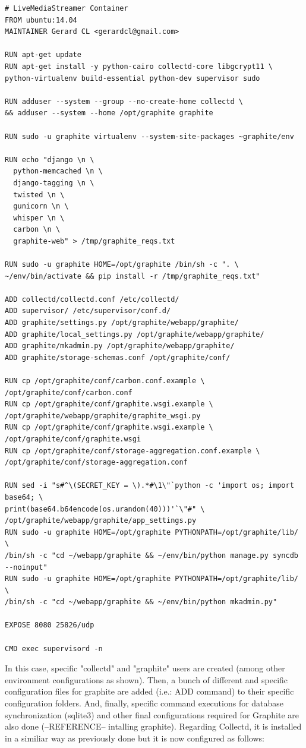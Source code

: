 \begin{verbatim}
# LiveMediaStreamer Container
FROM ubuntu:14.04
MAINTAINER Gerard CL <gerardcl@gmail.com>

RUN apt-get update
RUN apt-get install -y python-cairo collectd-core libgcrypt11 \
python-virtualenv build-essential python-dev supervisor sudo

RUN adduser --system --group --no-create-home collectd \
&& adduser --system --home /opt/graphite graphite

RUN sudo -u graphite virtualenv --system-site-packages ~graphite/env

RUN echo "django \n \
  python-memcached \n \
  django-tagging \n \
  twisted \n \
  gunicorn \n \
  whisper \n \
  carbon \n \
  graphite-web" > /tmp/graphite_reqs.txt

RUN sudo -u graphite HOME=/opt/graphite /bin/sh -c ". \
~/env/bin/activate && pip install -r /tmp/graphite_reqs.txt"

ADD collectd/collectd.conf /etc/collectd/
ADD supervisor/ /etc/supervisor/conf.d/
ADD graphite/settings.py /opt/graphite/webapp/graphite/
ADD graphite/local_settings.py /opt/graphite/webapp/graphite/
ADD graphite/mkadmin.py /opt/graphite/webapp/graphite/
ADD graphite/storage-schemas.conf /opt/graphite/conf/

RUN cp /opt/graphite/conf/carbon.conf.example \
/opt/graphite/conf/carbon.conf
RUN cp /opt/graphite/conf/graphite.wsgi.example \
/opt/graphite/webapp/graphite/graphite_wsgi.py
RUN cp /opt/graphite/conf/graphite.wsgi.example \
/opt/graphite/conf/graphite.wsgi
RUN cp /opt/graphite/conf/storage-aggregation.conf.example \
/opt/graphite/conf/storage-aggregation.conf

RUN sed -i "s#^\(SECRET_KEY = \).*#\1\"`python -c 'import os; import base64; \
print(base64.b64encode(os.urandom(40)))'`\"#" \
/opt/graphite/webapp/graphite/app_settings.py
RUN sudo -u graphite HOME=/opt/graphite PYTHONPATH=/opt/graphite/lib/ \
/bin/sh -c "cd ~/webapp/graphite && ~/env/bin/python manage.py syncdb --noinput"
RUN sudo -u graphite HOME=/opt/graphite PYTHONPATH=/opt/graphite/lib/ \
/bin/sh -c "cd ~/webapp/graphite && ~/env/bin/python mkadmin.py"

EXPOSE 8080 25826/udp

CMD exec supervisord -n
\end{verbatim}

In this case, specific "collectd" and "graphite" users are created (among other environment configurations as shown).
Then, a bunch of different and specific configuration files for graphite are added (i.e.: ADD command) to their specific configuration folders. And, finally, specific command executions for database synchronization (sqlite3) and other final configurations required for Graphite are also done (--REFERENCE-- intalling graphite). Regarding Collectd, it is installed in a similiar way as previously done but it is now configured as follows:

